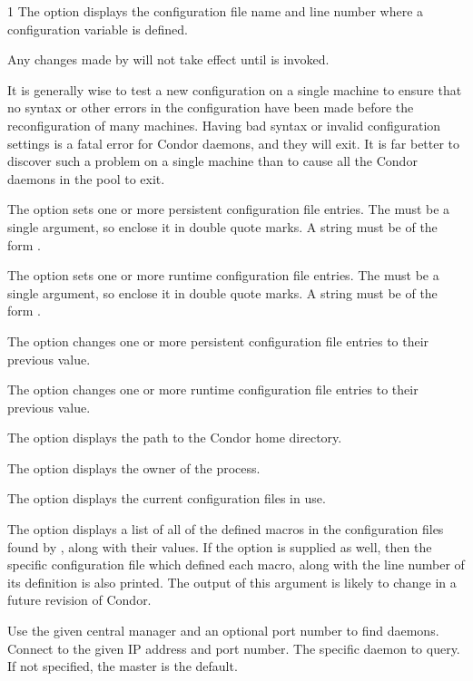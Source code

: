 \begin{ManPage}{\label{man-condor-config-val}}{1}
The  option displays the configuration
file name and line number where a configuration variable is defined.

Any changes made by  will not take effect
until  is invoked.

It is generally wise to test a new configuration on a single
machine to ensure that no syntax or other errors in the
configuration have been made before the reconfiguration of many machines.  
Having bad syntax or invalid configuration settings is a fatal error
for Condor daemons, and they will exit.
It is far better to discover such a problem on a single machine than to
cause all the Condor daemons in the pool to exit.

The  option sets one or more persistent configuration file entries.
The  must be a single argument, so enclose it in double quote marks.
A string must be of the form .

The  option sets one or more runtime configuration file entries.
The  must be a single argument, so enclose it in double quote marks.
A string must be of the form .

The  option changes one or more persistent configuration file
entries to their previous value.

The  option changes one or more runtime configuration file
entries to their previous value.

The  option displays the path to the Condor home directory.

The  option displays the owner of the  process.

The  option displays the current configuration files in use.

The  option displays a list of all of the defined macros
in the configuration files found by , along with
their values. If the  option is supplied as well,
then the specific configuration file which defined each macro,
along with the line number of its definition is also printed. 
\Note The output of this argument is likely to change 
in a future revision of Condor.

\begin{Options}
    { Use the given central manager and an optional port number
    to find daemons. }
    { Connect to the given IP address and port number. }
    {The specific daemon to query. 
    If not specified, the master is the default. }
\end{Options}


\end{ManPage}

